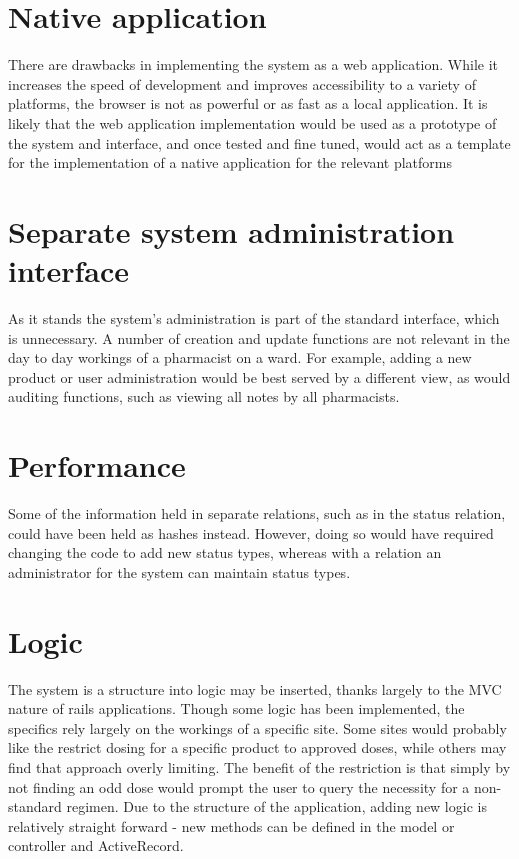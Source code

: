 \documentclass[letterpaper]{amsart}
\begin{document}
\section{Native application}
There are drawbacks in implementing the system as a web application.  While it increases the speed of development and improves accessibility to a variety of platforms, the browser is not as powerful or as fast as a local application.  It is likely that the web application implementation would be used as a prototype of the system and interface, and once tested and fine tuned, would act as a template for the implementation of a native application for the relevant platforms
\section{Separate system administration interface}
As it stands the system's administration is part of the standard interface, which is unnecessary.  A number of creation and update functions are not relevant in the day to day workings of a pharmacist on a ward.  For example, adding a new product or user administration would be best served by a different view, as would auditing functions, such as viewing all notes by all pharmacists.
\section{Performance}
Some of the information held in separate relations, such as in the status relation, could have been held as hashes instead.  However, doing so would have required changing the code to add new status types, whereas with a relation an administrator for the system can maintain status types.
\section{Logic}
The system is a structure into logic may be inserted, thanks largely to the MVC nature of rails applications.  Though some logic has been implemented, the specifics rely largely on the workings of a specific site.  Some sites would probably like the restrict dosing for a specific product to approved doses, while others may find that approach overly limiting.  The benefit of the restriction is that simply by not finding an odd dose would prompt the user to query the necessity for a non-standard regimen.
Due to the structure of the application, adding new logic is relatively straight forward - new methods can be defined in the model or controller and ActiveRecord. 
\end{document}
